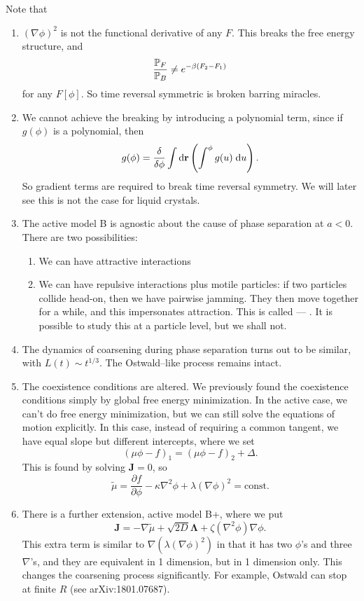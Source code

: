 \documentclass[a4paper]{article}
\begin{document}
Note that
\begin{enumerate}
  \item $(\nabla \phi)^2$ is not the functional derivative of any $F$. This breaks the free energy structure, and
    \[
      \frac{\P_F}{\P_B} \not= e^{-\beta (F_2 - F_1)}
    \]
    for any $F[\phi]$. So time reversal symmetric is broken barring miracles.
  \item We cannot achieve the breaking by introducing a polynomial term, since if $g(\phi)$ is a polynomial, then
    \[
      g(\phi) = \frac{\delta}{\delta \phi} \int \d \mathbf{r} \left(\int^\phi g(u)\;\d u\right).
    \]
    So gradient terms are required to break time reversal symmetry. We will later see this is not the case for liquid crystals.
  \item The active model B is agnostic about the cause of phase separation at $a < 0$. There are two possibilities:
    \begin{enumerate}
      \item We can have attractive interactions
      \item We can have repulsive interactions plus motile particles: if two particles collide head-on, then we have pairwise jamming. They then move together for a while, and this impersonates attraction. This is called  --- . It is possible to study this at a particle level, but we shall not.
    \end{enumerate}
  \item The dynamics of coarsening during phase separation turns out to be similar, with $L(t) \sim t^{1/3}$. The Ostwald--like process remains intact.
  \item The coexistence conditions are altered. We previously found the coexistence conditions simply by global free energy minimization. In the active case, we can't do free energy minimization, but we can still solve the equations of motion explicitly. In this case, instead of requiring a common tangent, we have equal slope but different intercepts, where we set
    \[
      (\mu \phi - f)_1 = (\mu \phi - f)_2 + \Delta.
    \]
    This is found by solving $\mathbf{J} = 0$, so
    \[
      \tilde{\mu} = \frac{\partial f}{\partial \phi} - \kappa \nabla^2 \phi + \lambda (\nabla \phi)^2 =\text{const}.
    \]
  \item There is a further extension, active model B+, where we put
    \[
      \mathbf{J} = -\nabla \tilde{\mu} + \sqrt{2D} \boldsymbol\Lambda + \zeta (\nabla^2 \phi) \nabla \phi.
    \]
    This extra term is similar to $\nabla (\lambda (\nabla \phi)^2)$ in that it has two $\phi$'s and three $\nabla$'s, and they are equivalent in 1 dimension, but in 1 dimension only. This changes the coarsening process significantly. For example, Ostwald can stop at finite $R$ (see arXiv:1801.07687).
\end{enumerate}
\end{document}
